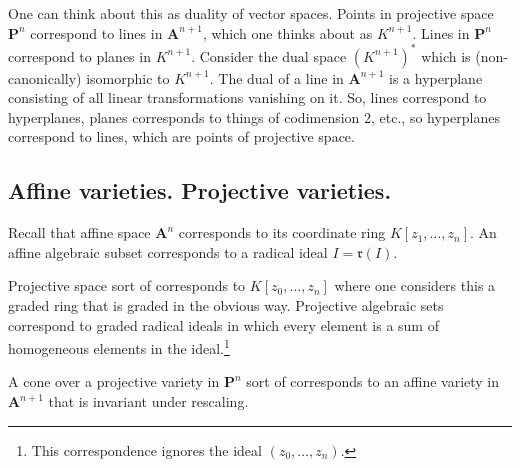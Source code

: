 \documentclass [11 pt, oneside] {article}
\begin{document}
One can think about this as duality of vector spaces. Points in projective space $\mathbf{P}^n$ correspond to lines in $\mathbf{A}^{n+1}$, which one thinks about as $K^{n+1}$. Lines in $\mathbf{P}^n$ correspond to planes in $K^{n+1}$. Consider the dual space $(K^{n+1})^*$ which is (non-canonically) isomorphic to $K^{n+1}$. The dual of a line in $\mathbf{A}^{n+1}$ is a hyperplane consisting of all linear transformations vanishing on it. So, lines correspond to hyperplanes, planes corresponds to things of codimension $2$, etc., so hyperplanes correspond to lines, which are points of projective space.

\subsection{Affine varieties. Projective varieties.}
Recall that affine space $\mathbf{A}^n$ corresponds to its coordinate ring $K[z_1,\hdots, z_n]$. An affine algebraic subset corresponds to a radical ideal $I=\mathfrak{r}({I}) $.

Projective space sort of corresponds to $K[z_0,\hdots, z_n]$ where one considers this a graded ring that is graded in the obvious way. Projective algebraic sets correspond to graded radical ideals in which every element is a sum of homogeneous elements in the ideal.\footnote{This correspondence ignores the ideal $(z_0,\hdots, z_n)$.} 

A cone over a projective variety in $\mathbf{P}^n$ sort of corresponds to an affine variety in $\mathbf{A}^{n+1}$ that is invariant under rescaling.
\end{document}
